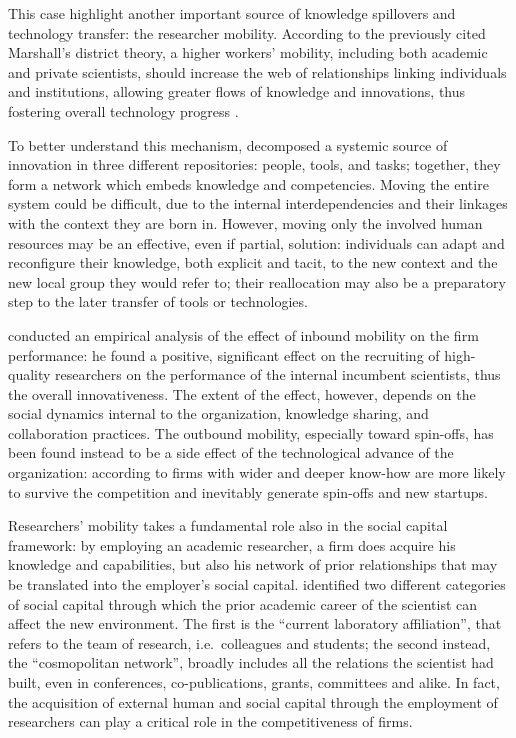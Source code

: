 This case highlight another important source of knowledge spillovers and technology transfer: the researcher mobility. According to the previously cited Marshall's district theory, a higher workers' mobility, including both academic and private scientists, should increase the web of relationships linking individuals and institutions, allowing greater flows of knowledge and innovations, thus fostering overall technology progress \citep{Cantner2006}.

To better understand this mechanism, \citet{Argote2000} decomposed a systemic source of innovation in three different repositories: people, tools, and tasks; together, they form a network which embeds knowledge and competencies. Moving the entire system could be difficult, due to the internal interdependencies and their linkages with the context they are born in. However, moving only the involved human resources may be an effective, even if partial, solution: individuals can adapt and reconfigure their knowledge, both explicit and tacit, to the new context and the new local group they would refer to; their reallocation may also be a preparatory step to the later transfer of tools or technologies. 

\citet{Slavova2015} conducted an empirical analysis of the effect of inbound mobility on the firm performance: he found a positive, significant effect on the recruiting of high-quality researchers on the performance of the internal incumbent scientists, thus the overall innovativeness. The extent of the effect, however, depends on the social dynamics internal to the organization, knowledge sharing, and collaboration practices. The outbound mobility, especially toward spin-offs, has been found instead to be a side effect of the technological advance of the organization: according to \citet{Franco2000} firms with wider and deeper know-how are more likely to survive the competition and inevitably generate spin-offs and new startups.

Researchers' mobility takes a fundamental role also in the social capital framework: by employing an academic researcher, a firm does acquire his knowledge and capabilities, but also his network of prior relationships that may be translated into the employer's social capital. \citet{Murray2004} identified two different categories of social capital through which the prior academic career of the scientist can affect the new environment. The first is the \enquote{current laboratory affiliation}, that refers to the team of research, i.e.\ colleagues and students; the second instead, the \enquote{cosmopolitan network}, broadly includes all the relations the scientist had built, even in conferences, co-publications, grants, committees and alike. In fact, the acquisition of external human and social capital through the employment of researchers can play a critical role in the competitiveness of firms.

